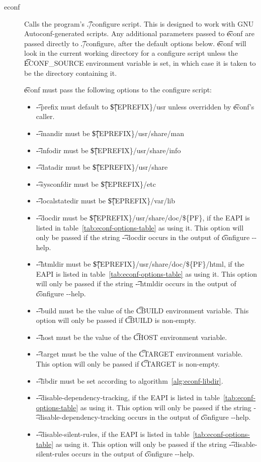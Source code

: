 \begin{description}
\item[econf] Calls the program's \t{./configure} script. This is designed to work with GNU
    Autoconf-generated scripts. Any additional parameters passed to \t{econf} are passed directly
    to \t{./configure}, after the default options below. \t{econf} will look in the current working
    directory for a configure script unless the \t{ECONF_SOURCE} environment variable is set,
    in which case it is taken to be the directory containing it.

     \t{econf} must pass the following options to the configure script:
    \begin{itemize}
    \item \t{-{}-prefix} must default to \t{\$\{EPREFIX\}/usr} unless overridden by \t{econf}'s
        caller.
    \item \t{-{}-mandir} must be \t{\$\{EPREFIX\}/usr/share/man}
    \item \t{-{}-infodir} must be \t{\$\{EPREFIX\}/usr/share/info}
    \item \t{-{}-datadir} must be \t{\$\{EPREFIX\}/usr/share}
    \item \t{-{}-sysconfdir} must be \t{\$\{EPREFIX\}/etc}
    \item \t{-{}-localstatedir} must be \t{\$\{EPREFIX\}/var/lib}
    \item \t{-{}-docdir} must be \t{\$\{EPREFIX\}/usr/share/doc/\$\{PF\}}, if the EAPI is listed in
        table~\ref{tab:econf-options-table} as using it. This option will only be passed if the
        string \t{-{}-docdir} occurs in the output of \t{configure -{}-help}.
    \item \t{-{}-htmldir} must be \t{\$\{EPREFIX\}/usr/share/doc/\$\{PF\}/html}, if the EAPI is
        listed in table~\ref{tab:econf-options-table} as using it. This option will only be passed
        if the string \t{-{}-htmldir} occurs in the output of \t{configure -{}-help}.
    \item \t{-{}-build} must be the value of the \t{CBUILD} environment variable. This option will
        only be passed if \t{CBUILD} is non-empty.
    \item \t{-{}-host} must be the value of the \t{CHOST} environment variable.
    \item \t{-{}-target} must be the value of the \t{CTARGET} environment variable. This option will
        only be passed if \t{CTARGET} is non-empty.
    \item \t{-{}-libdir} must be set according to algorithm~\ref{alg:econf-libdir}.
    \item \t{-{}-disable-dependency-tracking}, if the EAPI is listed in
        table~\ref{tab:econf-options-table} as using it. This option will only be passed if the
        string \t{-{}-disable-dependency-tracking} occurs in the output of \t{configure -{}-help}.
    \item \t{-{}-disable-silent-rules}, if the EAPI is listed in table~\ref{tab:econf-options-table}
        as using it. This option will only be passed if the string \t{-{}-disable-silent-rules}
        occurs in the output of \t{configure -{}-help}.
    \end{itemize}


\end{description}
